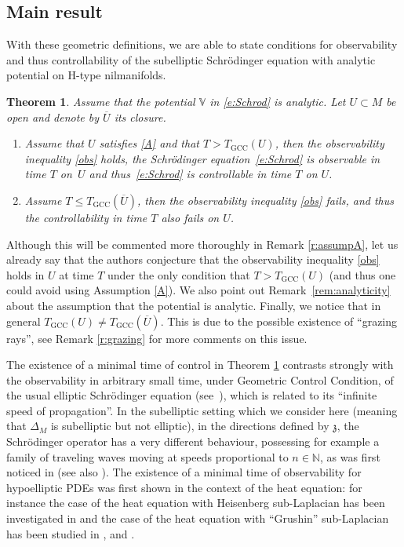 \documentclass[10pt]{amsart}
\newcommand{\GCC}{\mathrm{GCC}}
\theoremstyle{plain}
\newtheorem{theorem}{Theorem}[section]
\theoremstyle{definition}
\def\N{{\mathbb N}}
\def\bbV{{\mathbb V}}
\begin{document}
\subsection{Main result} \label{s:mainresfkl}

With these geometric definitions, we are able to state conditions for observability and thus controllability of the subelliptic Schrödinger equation with analytic potential on H-type nilmanifolds.


\begin{theorem}\label{t:main} Assume that the potential $\bbV$ in \eqref{e:Schrod} is analytic. Let $U\subset M$ be open and denote by $\overline{U}$ its closure.
\begin{enumerate}
\item Assume that $U$ satisfies \eqref{A} and that $T> T_\GCC(U)$, then the observability inequality \eqref{obs} holds, \ie the Schrödinger equation~\eqref{e:Schrod} is observable in time $T$ on~$U$ and thus~\eqref{e:Schrod} is controllable in time $T$ on $U$.
\item Assume $T\leq T_\GCC(\overline{U})$, then the observability inequality \eqref{obs} fails, and thus the controllability in time $T$ also fails on $U$.
\end{enumerate}
\end{theorem}


Although this will be commented more thoroughly in Remark \ref{r:assumpA}, let us already say that the authors conjecture that the observability inequality \eqref{obs} holds in $U$ at time $T$ under the only condition that $T>T_\GCC(U)$ (and thus one could avoid using Assumption \eqref{A}). We also point out Remark~\ref{rem:analyticity} about the assumption that the potential is analytic. Finally, we notice that in general $T_\GCC(U)\neq T_\GCC(\overline{U})$. This is due to the possible existence of ``grazing rays'', see Remark \ref{r:grazing} for more comments on this issue.

The existence of a minimal time of control in Theorem \ref{t:main} contrasts strongly with the observability in arbitrary small time, under Geometric Control Condition, of the usual elliptic Schrödinger equation (see~\cite{Leb}), which is related to its ``infinite speed of propagation''. In the subelliptic setting which we consider here (meaning that $\Delta_M$ is subelliptic but not elliptic), in the directions defined by $\mathfrak z$, the Schrödinger operator has a very different behaviour, possessing for example a family of traveling waves moving at speeds proportional to $n\in\N$, as was first noticed in \cite[\S 1]{BGX} (see also \cite[Th.\,2.10]{FF}). The existence of a minimal time of observability for hypoelliptic PDEs was first shown in the context of the heat equation: for instance the case of the heat equation with Heisenberg sub-Laplacian has been investigated in \cite{BC} and the case of the heat equation with ``Grushin'' sub-Laplacian has been studied in \cite{Koe}, \cite{DK} and \cite{BDE}.
\end{document}
